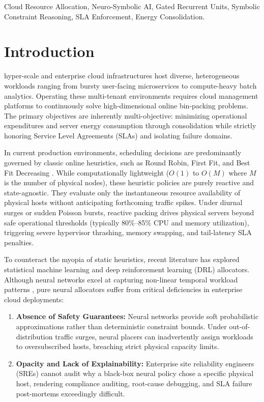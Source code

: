 \documentclass[conference]{IEEEtran}
\begin{document}
\begin{IEEEkeywords}
Cloud Resource Allocation, Neuro-Symbolic AI, Gated Recurrent Units, Symbolic Constraint Reasoning, SLA Enforcement, Energy Consolidation.
\end{IEEEkeywords}

\section{Introduction}
 hyper-scale and enterprise cloud infrastructures host diverse, heterogeneous workloads ranging from bursty user-facing microservices to compute-heavy batch analytics. Operating these multi-tenant environments requires cloud management platforms to continuously solve high-dimensional online bin-packing problems. The primary objectives are inherently multi-objective: minimizing operational expenditures and server energy consumption through consolidation while strictly honoring Service Level Agreements (SLAs) and isolating failure domains.

In current production environments, scheduling decisions are predominantly governed by classic online heuristics, such as Round Robin, First Fit, and Best Fit Decreasing \cite{beloglazov2012optimal}. While computationally lightweight ($O(1)$ to $O(M)$ where $M$ is the number of physical nodes), these heuristic policies are purely reactive and state-agnostic. They evaluate only the instantaneous resource availability of physical hosts without anticipating forthcoming traffic spikes. Under diurnal surges or sudden Poisson bursts, reactive packing drives physical servers beyond safe operational thresholds (typically 80\%--85\% CPU and memory utilization), triggering severe hypervisor thrashing, memory swapping, and tail-latency SLA penalties.

To counteract the myopia of static heuristics, recent literature has explored statistical machine learning and deep reinforcement learning (DRL) allocators. Although neural networks excel at capturing non-linear temporal workload patterns \cite{cho2014learning, shen2011cloudscale}, pure neural allocators suffer from critical deficiencies in enterprise cloud deployments:
\begin{enumerate}
    \item \textbf{Absence of Safety Guarantees:} Neural networks provide soft probabilistic approximations rather than deterministic constraint bounds. Under out-of-distribution traffic surges, neural placers can inadvertently assign workloads to oversubscribed hosts, breaching strict physical capacity limits.
    \item \textbf{Opacity and Lack of Explainability:} Enterprise site reliability engineers (SREs) cannot audit why a black-box neural policy chose a specific physical host, rendering compliance auditing, root-cause debugging, and SLA failure post-mortems exceedingly difficult.
\end{enumerate}
\end{document}
